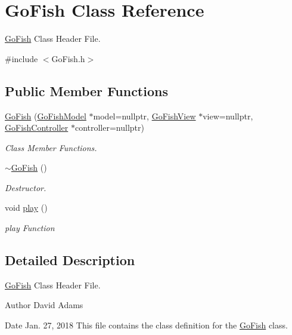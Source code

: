 \hypertarget{classGoFish}{\section{Go\-Fish Class Reference}
\label{classGoFish}
}


\hyperlink{classGoFish}{Go\-Fish} Class Header File.  




{\ttfamily \#include $<$Go\-Fish.\-h$>$}

\subsection*{Public Member Functions}
\begin{DoxyCompactItemize}
\item 
\hyperlink{classGoFish_a4f1851d1e0754a3df89852e43b17ad3b}{Go\-Fish} (\hyperlink{classGoFishModel}{Go\-Fish\-Model} $\ast$model=nullptr, \hyperlink{classGoFishView}{Go\-Fish\-View} $\ast$view=nullptr, \hyperlink{classGoFishController}{Go\-Fish\-Controller} $\ast$controller=nullptr)
\begin{DoxyCompactList}\small\item\em Class Member Functions. \end{DoxyCompactList}\item 
\hyperlink{classGoFish_a65bd5daab5e8fb039fc57f15bdb74eb9}{$\sim$\-Go\-Fish} ()
\begin{DoxyCompactList}\small\item\em Destructor. \end{DoxyCompactList}\item 
void \hyperlink{classGoFish_a9e88a08f8e8cf7db2fb9889d2ba47c38}{play} ()
\begin{DoxyCompactList}\small\item\em play Function \end{DoxyCompactList}\end{DoxyCompactItemize}


\subsection{Detailed Description}
\hyperlink{classGoFish}{Go\-Fish} Class Header File. 

\begin{DoxyAuthor}{Author}
David Adams 
\end{DoxyAuthor}
\begin{DoxyDate}{Date}
Jan. 27, 2018 This file contains the class definition for the \hyperlink{classGoFish}{Go\-Fish} class. 
\end{DoxyDate}


